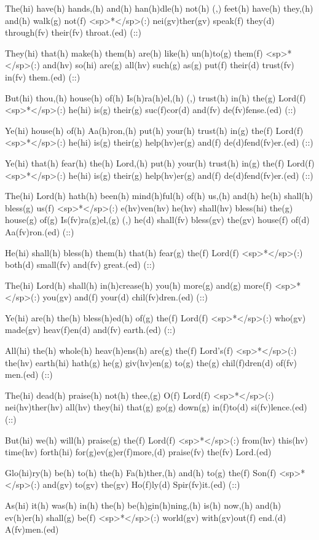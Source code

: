The(hi) have(h) hands,(h) and(h) han(h)dle(h) not(h) (,) feet(h) have(h) they,(h) and(h) walk(g) not(f) <sp>*</sp>(:) nei(gv)ther(gv) speak(f) they(d) through(fv) their(fv) throat.(ed) (::)

They(hi) that(h) make(h) them(h) are(h) like(h) un(h)to(g) them(f) <sp>*</sp>(:) and(hv) so(hi) are(g) all(hv) such(g) as(g) put(f) their(d) trust(fv) in(fv) them.(ed) (::)

But(hi) thou,(h) house(h) of(h) Is(h)ra(h)el,(h) (,) trust(h) in(h) the(g) Lord(f) <sp>*</sp>(:) he(hi) is(g) their(g) suc(f)cor(d) and(fv) de(fv)fense.(ed) (::)

Ye(hi) house(h) of(h) Aa(h)ron,(h) put(h) your(h) trust(h) in(g) the(f) Lord(f) <sp>*</sp>(:) he(hi) is(g) their(g) help(hv)er(g) and(f) de(d)fend(fv)er.(ed) (::)

Ye(hi) that(h) fear(h) the(h) Lord,(h) put(h) your(h) trust(h) in(g) the(f) Lord(f) <sp>*</sp>(:) he(hi) is(g) their(g) help(hv)er(g) and(f) de(d)fend(fv)er.(ed) (::)

The(hi) Lord(h) hath(h) been(h) mind(h)ful(h) of(h) us,(h) and(h) he(h) shall(h) bless(g) us(f) <sp>*</sp>(:) e(hv)ven(hv) he(hv) shall(hv) bless(hi) the(g) house(g) of(g) Is(fv)ra(g)el,(g) (,) he(d) shall(fv) bless(gv) the(gv) house(f) of(d) Aa(fv)ron.(ed) (::)

He(hi) shall(h) bless(h) them(h) that(h) fear(g) the(f) Lord(f) <sp>*</sp>(:)  both(d) small(fv) and(fv) great.(ed) (::)

The(hi) Lord(h) shall(h) in(h)crease(h) you(h) more(g) and(g) more(f) <sp>*</sp>(:) you(gv) and(f) your(d) chil(fv)dren.(ed) (::)

Ye(hi) are(h) the(h) bless(h)ed(h) of(g) the(f) Lord(f) <sp>*</sp>(:) who(gv) made(gv) heav(f)en(d) and(fv) earth.(ed) (::)

All(hi) the(h) whole(h) heav(h)ens(h) are(g) the(f) Lord's(f) <sp>*</sp>(:) the(hv) earth(hi) hath(g) he(g) giv(hv)en(g) to(g) the(g) chil(f)dren(d) of(fv) men.(ed) (::)

The(hi) dead(h) praise(h) not(h) thee,(g) O(f) Lord(f) <sp>*</sp>(:) nei(hv)ther(hv) all(hv) they(hi) that(g) go(g) down(g) in(f)to(d) si(fv)lence.(ed) (::)

But(hi) we(h) will(h) praise(g) the(f) Lord(f) <sp>*</sp>(:) from(hv) this(hv) time(hv) forth(hi) for(g)ev(g)er(f)more,(d) praise(fv) the(fv) Lord.(ed)

Glo(hi)ry(h) be(h) to(h) the(h) Fa(h)ther,(h) and(h) to(g) the(f) Son(f) <sp>*</sp>(:) and(gv) to(gv) the(gv) Ho(f)ly(d) Spir(fv)it.(ed) (::)

As(hi) it(h) was(h) in(h) the(h) be(h)gin(h)ning,(h) is(h) now,(h) and(h) ev(h)er(h) shall(g) be(f) <sp>*</sp>(:) world(gv) with(gv)out(f) end.(d) A(fv)men.(ed)
